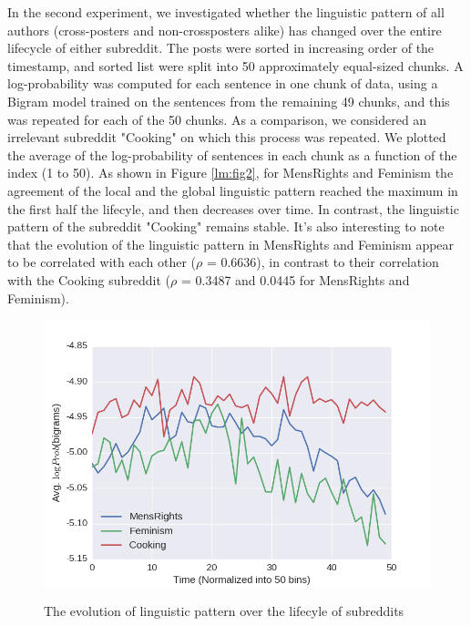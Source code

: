 \documentclass{article}
\begin{document}
In the second experiment, we investigated whether the linguistic pattern of all authors (cross-posters and non-crossposters alike) has changed over the entire lifecycle of either subreddit. The posts were sorted in increasing order of the timestamp, and sorted list were split into 50 approximately equal-sized chunks. A log-probability was computed for each sentence in one chunk of data, using a Bigram model trained on the sentences from the remaining 49 chunks, and this was repeated for each of the 50 chunks. As a comparison, we considered an irrelevant subreddit "Cooking" on which this process was repeated. We plotted the average of the log-probability of sentences in each chunk as a function of the index (1 to 50). As shown in Figure \ref{lm:fig2}, for MensRights and Feminism the agreement of the local and the global linguistic pattern reached the maximum in the first half the lifecyle, and then decreases over time. In contrast, the linguistic pattern of the subreddit "Cooking" remains stable. It's also interesting to note that the evolution of the linguistic pattern in MensRights and Feminism appear to be correlated with each other ($\rho$ = 0.6636), in contrast to their correlation with the Cooking subreddit ($\rho$ = 0.3487 and 0.0445 for MensRights and Feminism). 

\begin{figure}
    \centering
    \includegraphics{images/LM_figure_2.png}
    \label{lm:fig2_1}
    \caption{The evolution of linguistic pattern over the lifecyle of subreddits}
\end{figure}
\end{document}
